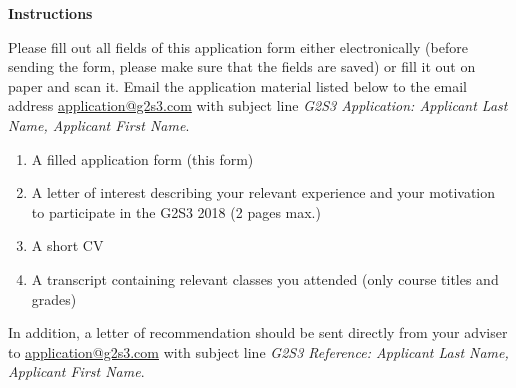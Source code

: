 \documentclass[12pt]{article}
\begin{document}
\begin{center}
\large  
\textbf{Instructions}
\end{center}
\noindent
Please fill out all fields of this application form either
electronically (before sending the form, please make sure that the
fields are saved) or fill it out on paper and scan it.
Email the application material listed below to the email address
\href{mailto:application@g2s3.com}{application@g2s3.com} with
subject line \textsl{G2S3 Application: Applicant Last Name, Applicant First Name}.\\

\begin{enumerate}
\item A filled application form (this form)
\item A letter of interest describing your relevant experience and your motivation to participate in the G2S3 2018 (2 pages max.)
\item A short CV
\item A transcript containing relevant classes you attended (only course titles and grades)
\end{enumerate}
\noindent{}In addition, a letter of recommendation should be sent directly from your adviser to \href{mailto:application@g2s3.com}{application@g2s3.com} with subject line \textsl{G2S3 Reference: Applicant Last Name, Applicant First Name}.\\

\\
\pagestyle{empty}
\end{document}
